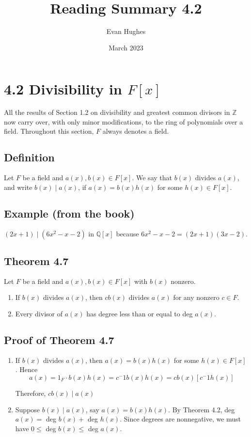 \documentclass{article}
\title{Reading Summary 4.2}
\author{Evan Hughes}
\date{March 2023}
\begin{document}
\maketitle
\section*{4.2 Divisibility in $F[x]$}
All the results of Section 1.2 on divisibility and greatest common divisors in $\mathbb{Z}$ now
carry over, with only minor modifications, to the ring of polynomials over a field.
Throughout this section, $F$ always denotes a field. 

\subsection*{Definition} Let $F$ be a field and $a(x), b(x) \in F[x]$. We say that $b(x)$ divides $a(x)$, and write $b(x) \mid a(x)$, if $a(x) = b(x)h(x)$ for some $h(x) \in F[x]$.

\subsection*{Example (from the book)} $(2x+1)\mid(6x^2-x-2)$ in $\mathbb{Q}[x]$ because $6x^2-x-2 = (2x+1)(3x-2)$.

\subsection*{Theorem 4.7}
Let $F$ be a field and $a(x), b(x) \in F[x]$ with $b(x)$ nonzero.
\begin{enumerate}
    \item If $b(x)$ divides $a(x)$, then $cb(x)$ divides $a(x)$ for any nonzero $c \in F$.
    \item Every divisor of $a(x)$ has degree less than or equal to deg $a(x)$.
\end{enumerate}

\subsection*{Proof of Theorem 4.7}
\begin{enumerate}
    \item If $b(x)$ divides $a(x)$, then $a(x) = b(x)h(x)$ for some $h(x) \in F[x]$. Hence
    \begin{equation}
        a(x) = 1_F \cdot b(x)h(x) = c^-1b(x)h(x) = cb(x)[c^-1h(x)]
    \end{equation}

    Therefore, $cb(x)\mid a(x)$
    \item Suppose $b(x)\mid a(x)$, say $a(x) = b(x)h(x)$. By Theorem 4.2, deg $a(x) = $ deg $b(x) + $ deg $h(x)$.
    Since degrees are nonnegative, we must have $0 \leq$ deg $b(x) \leq$ deg $a(x)$.
\end{enumerate}
\end{document}
